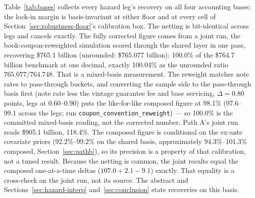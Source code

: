 \documentclass[12pt]{article}
\begin{document}
Table~\ref{tab:bases} collects every hazard leg's recovery on all four accounting bases; the lock-in margin is basis-invariant at either floor and at every cell of Section~\ref{sec:robustness-floor}'s calibration box. The netting is bit-identical across legs and cancels exactly. The fully corrected figure comes from a joint run, the book-coupon-reweighted simulation scored through the shared layer in one pass, recovering \$765.1 billion (unrounded: \$765.077 billion): 100.0\% of the \$764.7 billion benchmark at one decimal, exactly 100.04\% as the unrounded ratio $765.077/764.748$. That is a mixed-basis measurement. The reweight matches note rates to pass-through buckets, and converting the sample side to the pass-through basis first (note rate less the vintage guarantee fee and base servicing, $\Delta = 0.80$ points, legs at $0.60$--$0.90$) puts the like-for-like composed figure at 98.1\% (97.6--99.1 across the legs; run \texttt{coupon\_convention\_reweight}) --- so 100.0\% is the committed mixed-basis reading, not the corrected number. Path A's joint run reads \$905.1 billion, 118.4\%. The composed figure is conditional on the ex-ante covariate priors (92.2\%--99.2\% on the shared basis, approximately 94.3\%--101.3\% composed, Section~\ref{sec:pathb}), so its precision is a property of that calibration, not a tuned result. Because the netting is common, the joint results equal the composed one-at-a-time deltas ($107.0 + 2.1 - 9.1$) exactly. That equality is a cross-check on the joint run, not its source. The abstract and Sections~\ref{sec:hazard-interp} and~\ref{sec:conclusion} state recoveries on this basis.
\end{document}
